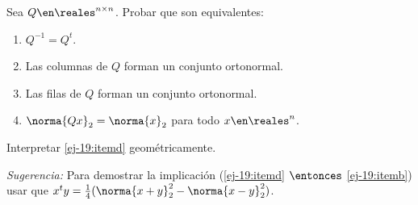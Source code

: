 \begin{enunciado}{\ejercicio}
  Sea $Q \en \reales^{n \times n}$. Probar que son equivalentes:
  \begin{enumerate}[label=(\alph*)]
    \item $Q^{-1} = Q^t$.

    \item\label{ej-19:itemb} Las columnas de $Q$ forman un conjunto ortonormal.

    \item Las filas de $Q$ forman un conjunto ortonormal.

    \item\label{ej-19:itemd} $\norma{Qx}_2 = \norma{x}_2$ para todo $x \en \reales^n$.
  \end{enumerate}
  Interpretar \ref{ej-19:itemd} geométricamente.

  \textit{Sugerencia:} Para demostrar la implicación
  (\ref{ej-19:itemd} $\entonces$ \ref{ej-19:itemb}) usar que $x^ty = \frac{1}{4}(\norma{x + y}_2^2 - \norma{x - y}_2^2)$.
\end{enunciado}

